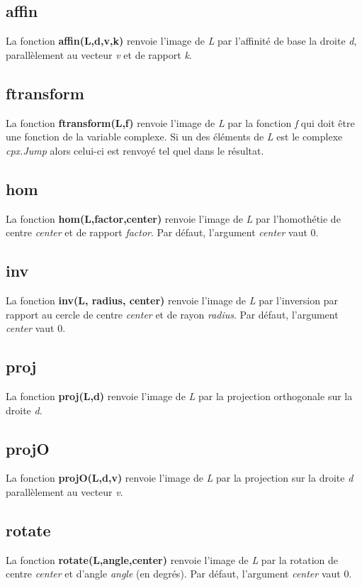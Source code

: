 \subsection{affin}
La fonction \textbf{affin(L,d,v,k)} renvoie l'image de \emph{L} par l'affinité de base la droite \emph{d}, parallèlement au vecteur \emph{v} et de rapport \emph{k}.

\subsection{ftransform}
La fonction \textbf{ftransform(L,f)} renvoie l'image de \emph{L} par la fonction \emph{f} qui doit être une fonction de la variable complexe. Si un des éléments de \emph{L} est le complexe \emph{cpx.Jump} alors celui-ci est renvoyé tel quel dans le résultat.

\subsection{hom}
La fonction \textbf{hom(L,factor,center)} renvoie l'image de \emph{L} par l'homothétie de centre \emph{center} et de rapport \emph{factor}. Par défaut, l'argument \emph{center} vaut 0.

\subsection{inv}
La fonction \textbf{inv(L, radius, center)} renvoie l'image de \emph{L} par l'inversion par rapport au cercle de centre \emph{center} et de rayon \emph{radius}. Par défaut, l'argument \emph{center} vaut 0.

\subsection{proj}
La fonction \textbf{proj(L,d)} renvoie l'image de \emph{L} par la projection orthogonale sur la droite \emph{d}.

\subsection{projO}
La fonction \textbf{projO(L,d,v)} renvoie l'image de \emph{L} par la projection sur la droite \emph{d} parallèlement au vecteur \emph{v}.

\subsection{rotate}
La fonction \textbf{rotate(L,angle,center)} renvoie l'image de \emph{L} par la rotation de centre \emph{center} et d'angle \emph{angle} (en degrés). Par défaut, l'argument \emph{center} vaut 0.  

